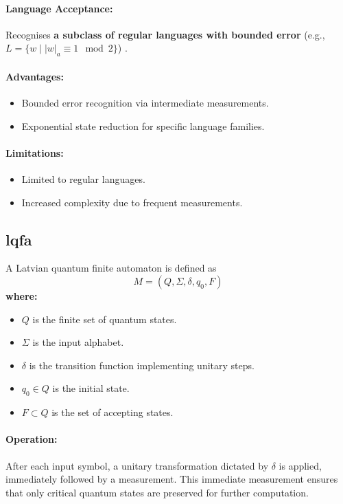 \paragraph{Language Acceptance:}  
Recognises \textbf{a subclass of regular languages with bounded error} (e.g., \( L = \{w \mid |w|_a \equiv 1 \mod 2\} \)) \cite{ambainis1998}.

\paragraph{Advantages:}
\begin{itemize}
    \item Bounded error recognition via intermediate measurements.
    \item Exponential state reduction for specific language families.
\end{itemize}

\paragraph{Limitations:}
\begin{itemize}
    \item Limited to regular languages.
    \item Increased complexity due to frequent measurements.
\end{itemize}

\subsection{\gls{lqfa}}
\label{subsec:lqfa}
\begin{definition}
A Latvian quantum finite automaton is defined as 
\[
M = (Q, \Sigma, \delta, q_0, F)
\]
\textbf{where:}
\begin{itemize}
    \item \( Q \) is the finite set of quantum states.
    \item \( \Sigma \) is the input alphabet.
    \item \( \delta \) is the transition function implementing unitary steps.
    \item \( q_0 \in Q \) is the initial state.
    \item \( F \subset Q \) is the set of accepting states.
\end{itemize}
\end{definition}

\paragraph{Operation:}  
After each input symbol, a unitary transformation dictated by \( \delta \) is applied, immediately followed by a measurement. This immediate measurement ensures that only critical quantum states are preserved for further computation.

